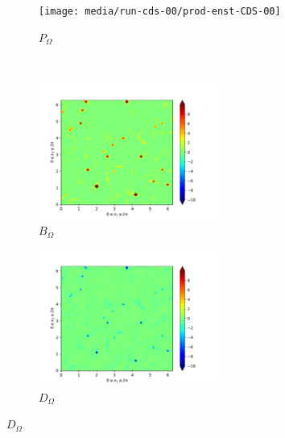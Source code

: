 \begin{figure}[H]
\begin{subfigure}{0.45\textwidth}
        \texttt{[image: media/run-cds-00/prod-enst-CDS-00]}
        \caption{$P_{\Omega}$}
    \end{subfigure}
    ~
    \begin{subfigure}{0.45\textwidth}
        \includegraphics[height=1.75in]{media/run-cds-00/B-enst-CDS-00}
        \caption{$B_{\Omega}$}
    \end{subfigure}
    \newline
    \begin{subfigure}{0.45\textwidth}
        \includegraphics[height=1.75in]{media/run-cds-00/D-enst-CDS-00}
        \caption{$D_{\Omega}$}
    \end{subfigure}
\end{figure}

